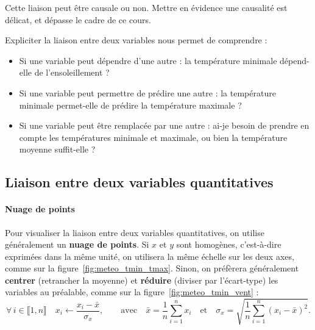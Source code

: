 Cette liaison peut être causale ou non. Mettre en évidence une causalité est
délicat, et dépasse le cadre de ce cours.

Expliciter la liaison entre deux variables nous permet de comprendre :
\begin{itemize}
	\item Si une variable peut dépendre d'une autre : la température minimale
	dépend-elle de l'ensoleillement ?
	\item Si une variable peut permettre de prédire une autre : la température
	minimale permet-elle de prédire la température maximale ?
	\item Si une variable peut être remplacée par une autre : ai-je besoin de
	prendre en compte les températures minimale et maximale, ou bien
	la température moyenne suffit-elle ?
\end{itemize}

\subsection{Liaison entre deux variables quantitatives}

\paragraph{Nuage de points}
Pour visualiser la liaison entre deux variables quantitatives, on utilise
généralement un \textbf{nuage de points}. Si $x$ et $y$ sont homogènes,
c'est-à-dire exprimées dans la même unité, on utilisera la même échelle sur les
deux axes, comme sur la figure~\ref{fig:meteo_tmin_tmax}. Sinon, on préfèrera
généralement \textbf{centrer} (retrancher la moyenne) et \textbf{réduire} (diviser par l'écart-type) les variables au préalable, comme sur la
figure~\ref{fig:meteo_tmin_vent} : 
\[
\forall\,i\in \llbracket 1, n \rrbracket \quad x_i \leftarrow \frac{x_i - \bar x}{\sigma_x}, \qquad \text{avec} \quad \bar x = \frac{1}{n} \sum_{i=1}^n x_i \quad
\text{et} \quad \sigma_x = \sqrt{\frac{1}{n} \sum_{i=1}^n(x_i - \bar x)^2}.
\]

